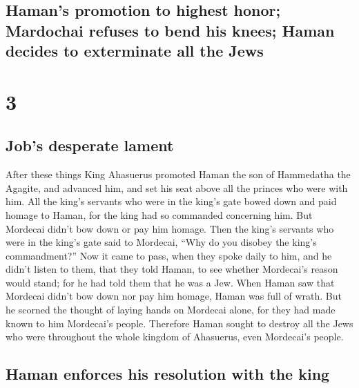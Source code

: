 \hypertarget{hamans-promotion-to-highest-honor-mardochai-refuses-to-bend-his-knees-haman-decides-to-exterminate-all-the-jews}{%
\subsection{Haman's promotion to highest honor; Mardochai refuses to
bend his knees; Haman decides to exterminate all the
Jews}\label{hamans-promotion-to-highest-honor-mardochai-refuses-to-bend-his-knees-haman-decides-to-exterminate-all-the-jews}}

\hypertarget{section-2}{%
\section{3}\label{section-2}}

\hypertarget{jobs-desperate-lament}{%
\subsection{Job's desperate lament}\label{jobs-desperate-lament}}

 After these things King Ahasuerus promoted Haman the son
of Hammedatha the Agagite, and advanced him, and set his seat above all
the princes who were with him.  All the king's servants
who were in the king's gate bowed down and paid homage to Haman, for the
king had so commanded concerning him. But Mordecai didn't bow down or
pay him homage.  Then the king's servants who were in the
king's gate said to Mordecai, ``Why do you disobey the king's
commandment?''  Now it came to pass, when they spoke daily
to him, and he didn't listen to them, that they told Haman, to see
whether Mordecai's reason would stand; for he had told them that he was
a Jew.  When Haman saw that Mordecai didn't bow down nor
pay him homage, Haman was full of wrath.  But he scorned
the thought of laying hands on Mordecai alone, for they had made known
to him Mordecai's people. Therefore Haman sought to destroy all the Jews
who were throughout the whole kingdom of Ahasuerus, even Mordecai's
people.

\hypertarget{haman-enforces-his-resolution-with-the-king}{%
\subsection{Haman enforces his resolution with the
king}\label{haman-enforces-his-resolution-with-the-king}}

